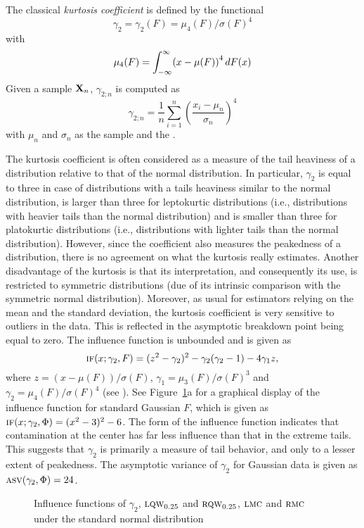 The classical \emph{kurtosis coefficient} is defined by the functional
\[
    \gamma_2 = \gamma_2(F) = \mu_{4}(F)/\sigma(F)^{4}
\]
with
\[
    \mu_{4}(F) = \int_{-\infty}^\infty \left(x-\mu(F)\right)^{4} \dif F(x)
\]
Given a sample $\mathbf X_n$, $\gamma_{2;n}$ is computed as
\[
    \gamma_{2;n} = \frac{1}{n} \sum_{i=1}^n \left(\frac{x_i-\mu_n}{\sigma_n}\right)^{4}
\]
with $\mu_n$ and $\sigma_n$ as the sample  and the . 

The kurtosis coefficient is often considered as a measure of the
tail heaviness of a distribution relative to that of the normal distribution.
In particular, $\gamma_2$ is equal to three in case of distributions with a
tails heaviness similar to the normal distribution, is larger than three for
leptokurtic distributions (i.e., distributions with heavier tails than the
normal distribution) and is smaller than three for platokurtic distributions
(i.e., distributions with lighter tails than the normal distribution).
However, since the coefficient also measures the peakedness of a
distribution, there is no agreement on what the kurtosis really estimates. Another
disadvantage of the kurtosis is that its interpretation, and consequently its
use, is restricted to symmetric distributions (due of its intrinsic
comparison with the symmetric normal distribution). Moreover, as usual for
estimators relying on the mean and the standard deviation, the kurtosis
coefficient is very sensitive to outliers in the data. This is reflected in
the asymptotic breakdown point being equal to zero. The influence function is unbounded 
and is given as
\[
    \stsc{IF}(x; \gamma_2,F) = (z^2-\gamma_2)^2 - \gamma_2(\gamma_2-1) - 4\gamma_1 z,
\]
where $z = \left(x-\mu(F)\right)/\sigma(F)$, $\gamma_1 = \mu_{3}(F)/\sigma(F)^{3}$ and
$\gamma_2 = \mu_{4}(F)/\sigma(F)^{4}$ (see \citealp{ruppert:1987}).
See Figure~\ref{fig:stat:IF_tail}a for a graphical display of the influence function for 
standard Gaussian $F$, which is given as $\stsc{IF}(x; \gamma_2, \Phi) = (x^2-3)^2-6$.
The form of the influence function indicates that contamination
at the center has far less influence than that in the extreme tails. This
suggests that $\gamma_2$ is primarily a measure of tail behavior, and only
to a lesser extent of peakedness. The asymptotic variance of $\gamma_2$ for Gaussian 
data is given as $\stsc{ASV}(\gamma_2, \Phi) = 24$.                           



\begin{figure}[h!]
    \centering
    \caption{Influence functions of $\gamma_2$, $\stsc{LQW}_{0.25}$ and $\stsc{RQW}_{0.25}$, $\stsc{LMC}$ and $\stsc{RMC}$ under the standard normal distribution}
    \label{fig:stat:IF_tail}
\end{figure}

